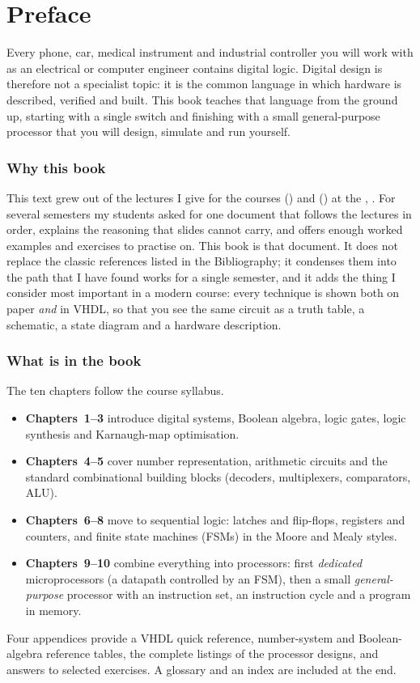 \chapter*{Preface}

Every phone, car, medical instrument and industrial controller you will work with as an electrical or computer engineer contains
digital logic. Digital design is therefore not a specialist topic: it is the common language in which hardware is described,
verified and built. This book teaches that language from the ground up, starting with a single switch and finishing with a
small general-purpose processor that you will design, simulate and run yourself.

\subsection*{Why this book}
This text grew out of the lectures I give for the courses \emph{\CourseName} (\CourseCode) and \emph{\CourseNameB} (\CourseCodeB) at the
\AuthorDept, \AuthorUni. For several semesters my students asked for one document that follows the lectures in order,
explains the reasoning that slides cannot carry, and offers enough worked examples and exercises to practise on. This book is that document.
It does not replace the classic references listed in the Bibliography; it condenses them into the path that I have found works
for a single semester, and it adds the thing I consider most important in a modern course: every technique is shown
both on paper \emph{and} in VHDL, so that you see the same circuit as a truth table, a schematic, a state diagram and a hardware description.

\subsection*{What is in the book}
The ten chapters follow the course syllabus.
\begin{itemize}
  \item \textbf{Chapters~1--3} introduce digital systems, Boolean algebra, logic gates, logic synthesis and Karnaugh-map optimisation.
  \item \textbf{Chapters~4--5} cover number representation, arithmetic circuits and the standard combinational building blocks (decoders, multiplexers, comparators, ALU).
  \item \textbf{Chapters~6--8} move to sequential logic: latches and flip-flops, registers and counters, and finite state machines (FSMs) in the Moore and Mealy styles.
  \item \textbf{Chapters~9--10} combine everything into processors: first \emph{dedicated} microprocessors (a datapath controlled by an FSM), then a small \emph{general-purpose} processor with an instruction set, an instruction cycle and a program in memory.
\end{itemize}
Four appendices provide a VHDL quick reference, number-system and Boolean-algebra reference tables, the complete listings of the processor designs,
and answers to selected exercises. A glossary and an index are included at the end.

